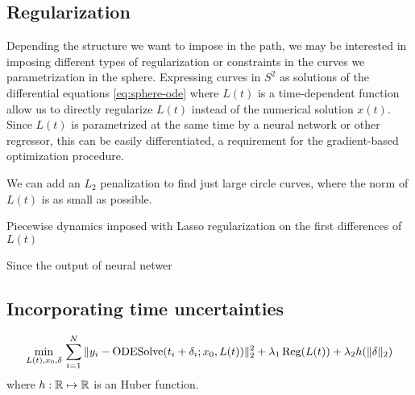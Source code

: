 \subsection{Regularization}

Depending the structure we want to impose in the path, we may be interested in imposing different types of regularization or constraints in the curves we parametrization in the sphere. 
Expressing curves in $S^2$ as solutions of the differential equations \eqref{eq:sphere-ode} where $L(t)$ is a time-dependent function allow us to directly regularize $L(t)$ instead of the numerical solution $x(t)$. 
Since $L(t)$ is parametrized at the same time by a neural network or other regressor, this can be easily differentiated, a requirement for the gradient-based optimization procedure.

We can add an $L_2$ penalization to find just large circle curves, where the norm of $L(t)$ is as small as possible. 

Piecewise dynamics imposed with Lasso regularization on the first differences of $L(t)$

Since the output of neural netwer

\subsection{Incorporating time uncertainties}

\begin{equation}
 \min_{L(t), x_0, \delta} \,
 \sum_{i=1}^N \| y_i - \operatorname{\text{ODESolve}} (t_i + \delta_i; x_0, L(t)) \|_2^2
 + 
 \lambda_1 
 \operatorname{\text{Reg}} (L(t))
 + 
 \lambda_2 
 h(\| \delta \|_2)
\end{equation}
where $h:\operatorname{\mathbb{R}} \mapsto \operatorname{\mathbb{R}}$ is an Huber function.

